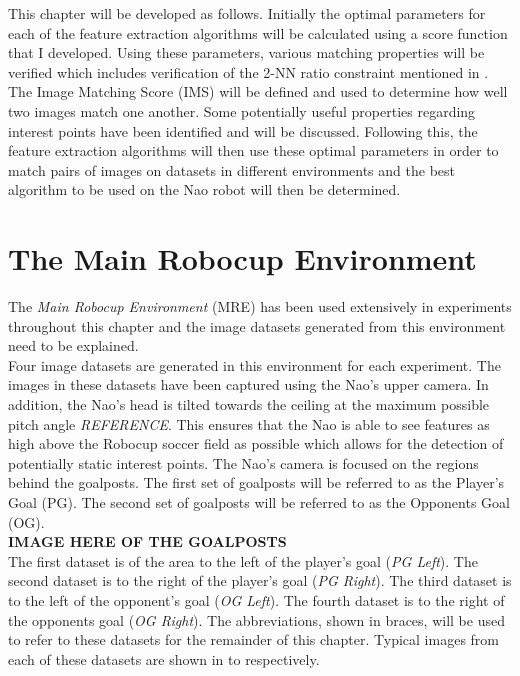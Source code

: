 \documentclass{report}
\begin{document}
This chapter will be developed as follows. Initially the optimal parameters for each of the feature extraction algorithms will be calculated using a score function that I developed. Using these parameters, various matching properties will be verified which includes verification of the 2-NN ratio constraint mentioned in . The Image Matching Score (IMS) will be defined and used to determine how well two images match one another. Some potentially useful properties regarding interest points have been identified and will be discussed. Following this, the feature extraction algorithms will then use these optimal parameters in order to match pairs of images on datasets in different environments and the best algorithm to be used on the Nao robot will then be determined.\\   




\section{The Main Robocup Environment}
\label{sec:datasets}
The \textit{Main Robocup Environment} (MRE) has been used extensively in experiments throughout this chapter and the image datasets generated from this environment need to be explained.\\

Four image datasets are generated in this environment for each experiment. The images in these datasets have been captured using the Nao's upper camera. In addition, the Nao's head is tilted towards the ceiling at the maximum possible pitch angle \textit{REFERENCE}. This ensures that the Nao is able to see features as high above the Robocup soccer field as possible which allows for the detection of potentially static interest points. The Nao's camera is focused on the regions behind the goalposts. The first set of goalposts will be referred to as the Player's Goal (PG). The second set of goalposts will be referred to as the Opponents Goal (OG). \\

\textbf{IMAGE HERE OF THE GOALPOSTS}\\

The first dataset is of the area to the left of the player's goal (\textit{PG Left}). The second dataset is to the right of the player's goal (\textit{PG Right}). The third dataset is to the left of the opponent's goal (\textit{OG Left}). The fourth dataset is to the right of the opponents goal (\textit{OG Right}). The abbreviations, shown in braces, will be used to refer to these datasets for the remainder of this chapter. Typical images from each of these datasets are shown in  to  respectively.\\
\end{document}
